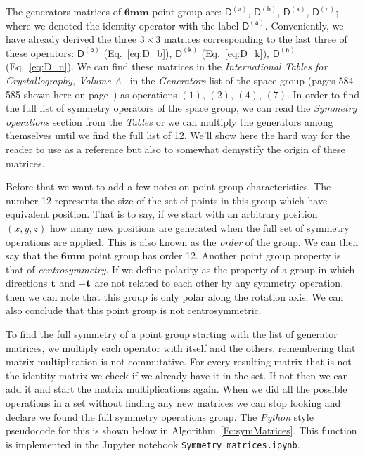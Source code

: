 The generators matrices of $\mathbf{6mm}$ point group are: $\mathsf{D^{(a)}}$,  $\mathsf{D^{(b)}}$, $\mathsf{D^{(k)}}$, $\mathsf{D^{(n)}}$; where we denoted the identity operator with the label $\mathsf{D^{(a)}}$. Conveniently, we have already derived the three $3\times3$ matrices corresponding to the last three of these operators: $\mathsf{D^{(b)}}$ (Eq.~\ref{eq:D_b}), $\mathsf{D^{(k)}}$ (Eq.~\ref{eq:D_k}), $\mathsf{D^{(n)}}$ (Eq.~\ref{eq:D_n}). We can find these matrices in the \textit{International Tables for Crystallography, Volume A}~\cite{IntTableCrysA} in the \textit{Generators} list of the space group (pages 584-585 shown here on page~\pageref{Fig:ITC}) as operations $(1)$, $(2)$, $(4)$, $(7)$. In order to find the full list of symmetry operators of the space group, we can read the \textit{Symmetry operations} section from the \textit{Tables} or we can multiply the generators among themselves until we find the full list of 12. We'll show here the hard way for the reader to use as a reference but also to somewhat demystify the origin of these matrices.


Before that we want to add a few notes on point group characteristics. The number 12 represents the size of the set of points in this group which have equivalent position. That is to say, if we start with an arbitrary position $(x, y, z)$ how many new positions are generated when the full set of symmetry operations are applied. This is also known as the \textit{order} of the group. We can then say that the $\mathbf{6mm}$ point group has order 12. 
Another point group property is that of \textit{centrosymmetry}.  If we define polarity as the property of a group in which directions $\vb{t}$ and $\vb{-t}$ are not related to each other by any symmetry operation, then we can note that this group is only polar along the rotation axis. We can also conclude that this point group is not centrosymmetric.


To find the full symmetry of a point group starting with the list of generator matrices, we multiply each operator with itself and the others, remembering that matrix multiplication is not commutative. For every resulting matrix that is not the identity matrix we check if we already have it in the set. If not then we can add it and start the matrix multiplications again. When we did all the possible operations in a set without finding any new matrices we can stop looking and declare we found the full symmetry operations group. The \emph{Python} style pseudocode for this is shown below in Algorithm~\ref{Fc:symMatrices}. This function is implemented in the Jupyter notebook \texttt{Symmetry\_matrices.ipynb}. 

